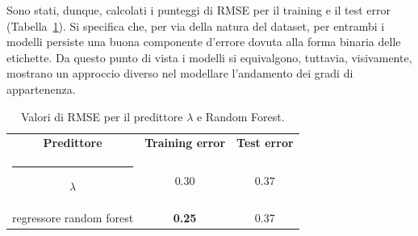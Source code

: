\documentclass[12pt]{report}
\makeatletter
\theoremstyle{definition}
\newcommand{\thickhline}{%
    \noalign {\ifnum 0=`}\fi \hrule height 1pt
    \futurelet \reserved@a \@xhline
}
\makeatother
\begin{document}
Sono stati, dunque, calcolati i punteggi di RMSE per il training e il test error (Tabella~\ref{rmse_exp7}). Si specifica che, per via della natura del dataset, per entrambi i modelli persiste una buona componente d'errore dovuta alla forma binaria delle etichette. Da questo punto di vista i modelli si equivalgono, tuttavia, visivamente, mostrano un approccio diverso nel modellare l'andamento dei gradi di appartenenza.
\begin{table}
\centering
\begin{adjustbox}{max width=\textwidth}
 \begin{tabular}{|c|c|c|} 
 \hline
\textbf{Predittore} & \textbf{Training error} & \textbf{Test error}
\\ [0.5ex] 
 \thickhline
 $\lambda$ & 0.30 & 0.37 \\
 regressore random forest & \textbf{0.25} & 0.37
 \\
 \hline
\end{tabular}
\end{adjustbox}
\caption{Valori di RMSE per il predittore $\lambda$ e Random Forest.}
\label{rmse_exp7}
\end{table}
\end{document}
